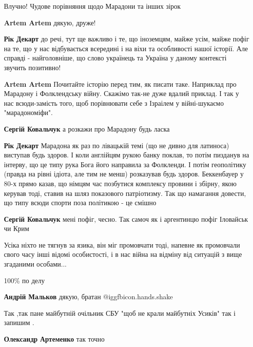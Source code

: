 \begin{itemize}
Влучно! Чудове порівняння щодо Марадони та інших зірок

\begin{itemize} %
\textbf{Artem Artem} дякую, друже!

\textbf{Рік Декарт} до речі, тут ще важливо і те, що іноземцям, майже усім, майже пофіг на те, що у нас відбувається всередині і на віхи та особливості нашої історії. Але справді - найголовніше, що слово українець та Україна у даному контексті звучить позитивно!

\textbf{Artem Artem} Почитайте історію перед тим, як писати таке. Наприклад про Марадону і Фолклендську війну. Скажімо так-не дуже вдалий приклад. І так у нас всюди-замість того, щоб порівнювати себе з Ізраілем у війні-шукаємо "марадономіфи".

\textbf{Сергій Ковальчук} а розкажи про Марадону будь ласка

\textbf{Рік Декарт} Марадона як раз по лівацькій темі (що не дивно для латиноса) виступав будь здоров. І коли англійцям рукою банку поклав, то потім пизданув на інтерву, що це типу рука Бога його направила за Фолкленди. І потім геополітику (правда на рівні ідіота, але тим не менш) розказував будь здоров. Беккенбауер у 80-х прямо казав, що німцям час позбутися комплексу провини і збірну, якою керував тоді, ставив на шляз показового патріотизму. Так що намагання довести, що типу всюди спорти поза політикою - це смішно

\textbf{Сергій Ковальчук} мені пофіг, чесно. Так самоч як і аргентинцю пофіг Іловайськ чи Крим
\end{itemize} %


Усіка ніхто не тягнув за язика, він міг промовчати тоді, напевне як промовчали
свого часу інші відомі особистості, і в нас війна на відміну від ситуацій з
вище згаданими особами...


100\% по делу

\begin{itemize} %
\textbf{Андрій Мальков} дякую, братан  @igg{fbicon.hands.shake} 
\end{itemize} %

Так ,так пане майбутній очільник СБУ "щоб не крали майбутніх Усиків" так і запишим .

\begin{itemize} %
\textbf{Олександр Артеменко} так точно
\end{itemize} %


\end{itemize}
